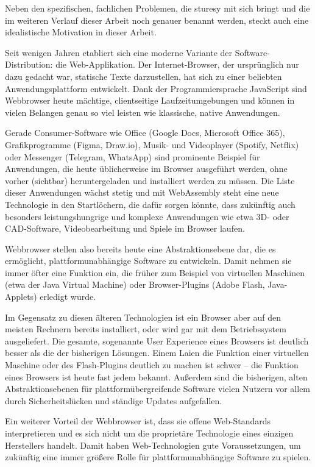 Neben den spezifischen, fachlichen Problemen, die \ac{sturesy} mit sich bringt und die im weiteren Verlauf dieser Arbeit noch genauer benannt werden, steckt auch eine idealistische Motivation in dieser Arbeit.

Seit wenigen Jahren etabliert sich eine moderne Variante der Software-Distribution: die Web-Applikation. Der Internet-Browser, der ursprünglich nur dazu gedacht war, statische Texte darzustellen, hat sich zu einer beliebten Anwendungsplattform entwickelt. Dank der Programmiersprache JavaScript sind Webbrowser heute mächtige, clientseitige Laufzeitumgebungen und können in vielen Belangen genau so viel leisten wie klassische, native Anwendungen.

Gerade Consumer-Software wie Office (Google Docs, Microsoft Office 365), Grafikprogramme (Figma, Draw.io), Musik- und Videoplayer (Spotify, Netflix) oder Messenger (Telegram, WhatsApp) sind prominente Beispiel für Anwendungen, die heute üblicherweise im Browser ausgeführt werden, ohne vorher (sichtbar) heruntergeladen und installiert werden zu müssen. Die Liste dieser Anwendungen wächst stetig und mit WebAssembly steht eine neue Technologie in den Startlöchern, die dafür sorgen könnte, dass zukünftig auch besonders leistungshungrige und komplexe Anwendungen wie etwa 3D- oder CAD-Software, Videobearbeitung und Spiele im Browser laufen.

Webbrowser stellen also bereits heute eine Abstraktionsebene dar, die es ermöglicht, plattformunabhängige Software zu entwickeln. Damit nehmen sie immer öfter eine Funktion ein, die früher zum Beispiel von virtuellen Maschinen (etwa der Java Virtual Machine) oder Browser-Plugins (Adobe Flash, Java-Applets) erledigt wurde.

Im Gegensatz zu diesen älteren Technologien ist ein Browser aber auf den meisten Rechnern bereits installiert, oder wird gar mit dem Betriebssystem ausgeliefert. Die gesamte, sogenannte User Experience eines Browsers ist deutlich besser als die der bisherigen Lösungen. Einem Laien die Funktion einer virtuellen Maschine oder des Flash-Plugins deutlich zu machen ist schwer – die Funktion eines Browsers ist heute fast jedem bekannt. Außerdem sind die bisherigen, alten Abstraktionsebenen für plattformübergreifende Software vielen Nutzern vor allem durch Sicherheitslücken und ständige Updates aufgefallen.

Ein weiterer Vorteil der Webbrowser ist, dass sie offene Web-Standards interpretieren und es sich nicht um die proprietäre Technologie eines einzigen Herstellers handelt. Damit haben Web-Technologien gute Voraussetzungen, um zukünftig eine immer größere Rolle für plattformunabhängige Software zu spielen.


